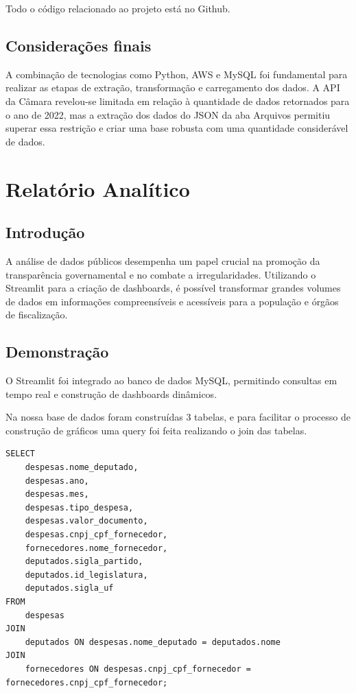 \documentclass[12pt, a4paper]{article}
\begin{document}
Todo o código relacionado ao projeto está no Github\cite{github_repo}.

\subsection{Considerações finais}

A combinação de tecnologias como Python, AWS e MySQL foi fundamental para realizar as etapas de extração, transformação e carregamento dos dados. A API da Câmara revelou-se limitada em relação à quantidade de dados retornados para o ano de 2022, mas a extração dos dados do JSON da aba Arquivos permitiu superar essa restrição e criar uma base robusta com uma quantidade considerável de dados.

\section{Relatório Analítico}

\subsection{Introdução}

A análise de dados públicos desempenha um papel crucial na promoção da transparência governamental e no combate a irregularidades. Utilizando o Streamlit para a criação de dashboards, é possível transformar grandes volumes de dados em informações compreensíveis e acessíveis para a população e órgãos de fiscalização.

\subsection{Demonstração}

O Streamlit foi integrado ao banco de dados MySQL, permitindo consultas em tempo real e construção de dashboards dinâmicos.

Na nossa base de dados foram construídas 3 tabelas, e para facilitar o processo de construção de gráficos uma query foi feita realizando o join das tabelas.

\begin{verbatim}
SELECT
	despesas.nome_deputado,
	despesas.ano,
	despesas.mes,
	despesas.tipo_despesa,
	despesas.valor_documento,
	despesas.cnpj_cpf_fornecedor,
	fornecedores.nome_fornecedor,
	deputados.sigla_partido,
	deputados.id_legislatura,
	deputados.sigla_uf
FROM
	despesas
JOIN
	deputados ON despesas.nome_deputado = deputados.nome
JOIN
	fornecedores ON despesas.cnpj_cpf_fornecedor = fornecedores.cnpj_cpf_fornecedor;
\end{verbatim}
\end{document}
